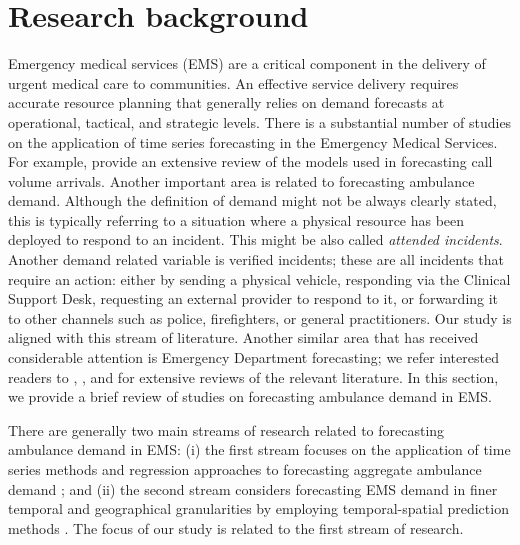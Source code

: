 \documentclass[
  authoryear,
  preprint,
  3p]{elsarticle}
\begin{document}
\section{Research background}\label{sec-lit}

Emergency medical services (EMS) are a critical component in the
delivery of urgent medical care to communities. An effective service
delivery requires accurate resource planning that generally relies on
demand forecasts at operational, tactical, and strategic levels. There
is a substantial number of studies on the application of time series
forecasting in the Emergency Medical Services. For example,
\citet{ibrahim2016modeling} provide an extensive review of the models
used in forecasting call volume arrivals. Another important area is
related to forecasting ambulance demand. Although the definition of
demand might not be always clearly stated, this is typically referring
to a situation where a physical resource has been deployed to respond to
an incident. This might be also called \emph{attended incidents}.
Another demand related variable is verified incidents; these are all
incidents that require an action: either by sending a physical vehicle,
responding via the Clinical Support Desk, requesting an external
provider to respond to it, or forwarding it to other channels such as
police, firefighters, or general practitioners. Our study is aligned
with this stream of literature. Another similar area that has received
considerable attention is Emergency Department forecasting; we refer
interested readers to \citet{mingliterature2022},
\citet{gul2020exhaustive}, and \citet{wargon2009systematic} for
extensive reviews of the relevant literature. In this section, we
provide a brief review of studies on forecasting ambulance demand in
EMS.

There are generally two main streams of research related to forecasting
ambulance demand in EMS: (i) the first stream focuses on the application
of time series methods and regression approaches to forecasting
aggregate ambulance demand \citep{vile2012predicting, sasaki2010using};
and (ii) the second stream considers forecasting EMS demand in finer
temporal and geographical granularities by employing temporal-spatial
prediction methods \citep{zhou2016predicting, zhou2016predictinglit}.
The focus of our study is related to the first stream of research.
\end{document}
